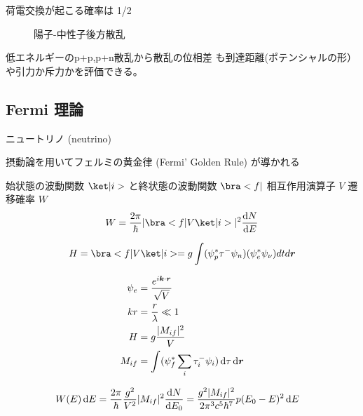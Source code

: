 \documentclass[uplatex,dvipdfmx,a4paper,11pt]{jlreq}
\newcommand{\rr}{\bm{r}}
\newcommand{\kk}{\bm{k}}
\numberwithin{equation}{section}
\theoremstyle{definition}
\begin{document}
荷電交換が起こる確率は 1/2
\begin{figure}[htpb]
  \centering
  \caption{陽⼦-中性⼦後⽅散乱}
\end{figure}

低エネルギーのp+p,p+n散乱から散乱の位相差
も到達距離(ポテンシャルの形）や引⼒か斥⼒かを評価できる。

\subsection{Fermi 理論}
ニュートリノ (neutrino)

摂動論を用いてフェルミの黄金律 (Fermi' Golden Rule) が導かれる

始状態の波動関数 $\ket|i>$ と終状態の波動関数 $\bra<f|$ 相互作用演算子 $V$
遷移確率 $W$
\begin{align}
  W = \frac{2\pi}{\hbar}|\bra<f|V\ket|i>|^2\diff{N}{E}
\end{align}

\begin{align}
  H = \bra<f|V\ket|i> = g\int(\psi_p^*\tau^-\psi_n)(\psi_e^*\psi_\nu)dt d\rr
\end{align}

\begin{align}
  \psi_e & = \frac{e^{i\kk\cdot\rr}}{\sqrt{V}}                   \\
  kr     & = \frac{r}{\lambda} \ll 1                             \\
  H      & = g\frac{|M_{if}|^2}{V}                               \\
  M_{if} & = \int(\psi_f^*\sum_i\tau_i^-\psi_i)\dl{\tau}\dl{\rr}
\end{align}

\begin{align}
  W(E)\dl{E} & = \frac{2\pi}{\hbar}\frac{g^2}{V^2}|M_{if}|^2\diff{N}{E_0} = \frac{g^2|M_{if}|^2}{2\pi^3c^5\hbar^7}p(E_0 - E)^2\dl{E}
\end{align}
\end{document}

